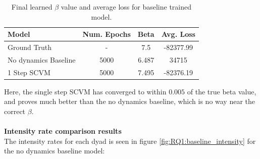 \begin{table}[H]
\centering
\begin{tabular}{|l|c|cc|}
\hline
Model         & \multicolumn{1}{l|}{Num. Epochs} & Beta & Avg. Loss \\ \hline
Ground Truth  & -                                & 7.5  & -82377.99  \\
No dynamics Baseline & 5000                             & 6.487  & 34715        \\
1 Step SCVM  & 5000                             & 7.495   & -82376.19      \\ \hline
\end{tabular}
\caption{Final learned $\beta$ value and average loss for baseline trained model.}
\label{tab:SingleStep1}
\end{table}
\noindent
Here, the single step SCVM has converged to within $0.005$ of the true beta value, and proves much better than the no dynamics baseline, which is no way near the correct $\beta$.
\\\\
\textbf{Intensity rate comparison results}
\\
The intensity rates for each dyad is seen in figure \ref{fig:RQ1:baseline_intensity} for the no dynamics baseline model:

